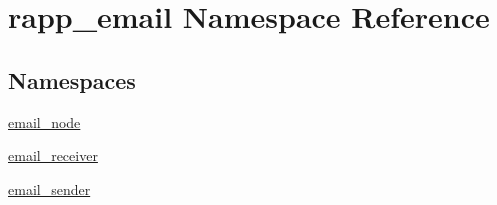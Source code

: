 \hypertarget{namespacerapp__email}{\section{rapp\-\_\-email Namespace Reference}
\label{namespacerapp__email}
}
\subsection*{Namespaces}
\begin{DoxyCompactItemize}
\item 
\hyperlink{namespacerapp__email_1_1email__node}{email\-\_\-node}
\item 
\hyperlink{namespacerapp__email_1_1email__receiver}{email\-\_\-receiver}
\item 
\hyperlink{namespacerapp__email_1_1email__sender}{email\-\_\-sender}
\end{DoxyCompactItemize}
